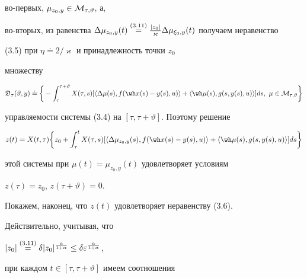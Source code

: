 во-первых, $\mu_{z_0,y}\in\cal M_{\tau,\vartheta}$, а,


во-вторых, из равенства $\Delta\mu_{z_0,y}(t)\up{(3.11)}{=}


\frac{|z_0|}{\varkappa}\Delta\mu_{\xi_0,y}(t)$ получаем неравенство


(3.5) при $\eta\doteq2/\varkappa$ и принадлежность точки $z_0$


множеству


$$


\frak D_\tau(\vartheta ,y)\doteq


\bigg\{-\int_\tau^{\tau+\vartheta }X(\tau,s)


[\langle\Delta\mu(s),f(\wh x(s)-y(s),u)\rangle+


\langle\wh\mu(s),g(s,y(s),u)\rangle]ds,\ \mu\in


\cal M_{\tau,\vartheta}\bigg\}


$$


управляемости системы (3.4) на $[\tau,\tau+\vartheta ]$. Поэтому решение


$$


z(t)=X(t,\tau)\bigg\{z_0+\int_\tau^{t}X(\tau,s)


[\langle\Delta\mu_{z_0,y}(s),f(\wh x(s)-y(s),u)\rangle+


\langle\wh\mu(s),g(s,y(s),u)\rangle]ds\bigg\}


$$


этой системы при $\mu(t)=\mu_{z_0,y}(t)$ удовлетворяет условиям


$z(\tau)=z_0$, $z(\tau+\vartheta)=0$.





Покажем, наконец, что $z(t)$ удовлетворяет неравенству (3.6). 


Действительно, учитывая, что


$|z_0|\up{(3.11)}{=}\delta|z_0|^{\frac{\alpha }{1+\alpha}}


\le\delta\varepsilon^{\frac{\alpha }{1+\alpha}}$,


при каждом $t\in[\tau,\tau+\vartheta]$ имеем соотношения


